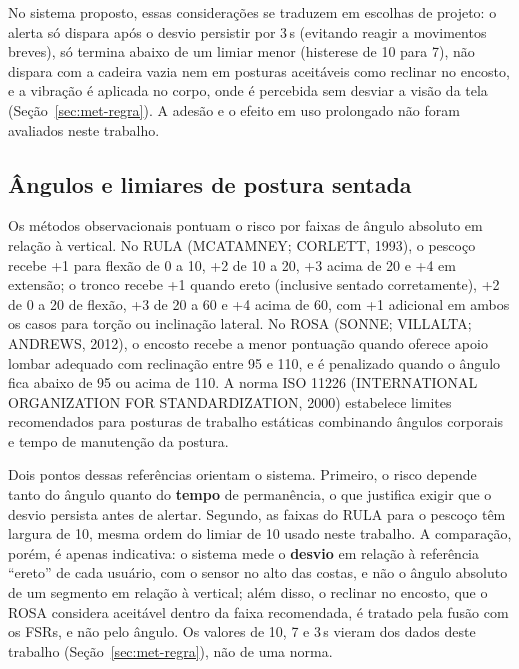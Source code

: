 No sistema proposto, essas considerações se traduzem em escolhas de projeto: o
alerta só dispara após o desvio persistir por 3\,s (evitando reagir a movimentos
breves), só termina abaixo de um limiar menor (histerese de 10\degree{} para
7\degree{}), não dispara com a cadeira vazia nem em posturas aceitáveis como
reclinar no encosto, e a vibração é aplicada no corpo, onde é percebida sem
desviar a visão da tela (Seção~\ref{sec:met-regra}). A adesão e o efeito em uso
prolongado não foram avaliados neste trabalho.

\subsection{Ângulos e limiares de postura sentada}
\label{sec:rev-limiares}

Os métodos observacionais pontuam o risco por faixas de ângulo absoluto em relação
à vertical. No RULA (MCATAMNEY; CORLETT, 1993), o pescoço recebe +1 para flexão de
0 a 10\degree{}, +2 de 10 a 20\degree{}, +3 acima de 20\degree{} e +4 em extensão;
o tronco recebe +1 quando ereto (inclusive sentado corretamente), +2 de 0 a 20\degree{} de
flexão, +3 de 20 a 60\degree{} e +4 acima de 60\degree{}, com +1 adicional em ambos
os casos para torção ou inclinação lateral. No ROSA (SONNE; VILLALTA; ANDREWS, 2012),
o encosto recebe a menor pontuação quando oferece apoio lombar adequado com
reclinação entre 95 e 110\degree{}, e é penalizado quando o ângulo fica abaixo de
95\degree{} ou acima de 110\degree{}. A norma ISO 11226 (INTERNATIONAL ORGANIZATION
FOR STANDARDIZATION, 2000) estabelece limites recomendados para posturas de
trabalho estáticas combinando ângulos corporais e tempo de manutenção da postura.

Dois pontos dessas referências orientam o sistema. Primeiro, o risco depende tanto
do ângulo quanto do \textbf{tempo} de permanência, o que justifica exigir que o
desvio persista antes de alertar. Segundo, as faixas do RULA para o pescoço têm
largura de 10\degree{}, mesma ordem do limiar de 10\degree{} usado neste trabalho.
A comparação, porém, é apenas indicativa: o sistema mede o \textbf{desvio} em
relação à referência ``ereto'' de cada usuário, com o sensor no alto das costas, e
não o ângulo absoluto de um segmento em relação à vertical; além disso, o
reclinar no encosto, que o ROSA considera aceitável dentro da faixa recomendada, é
tratado pela fusão com os FSRs, e não pelo ângulo. Os valores de 10\degree{},
7\degree{} e 3\,s vieram dos dados deste trabalho
(Seção~\ref{sec:met-regra}), não de uma norma.

